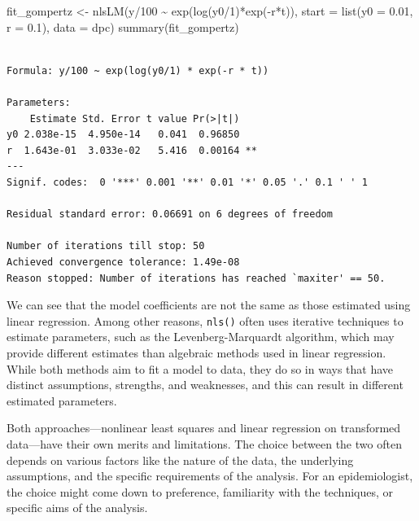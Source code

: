 \documentclass[
  letterpaper,
]{book}
\newenvironment{Shaded}{\begin{snugshade}}{\end{snugshade}}
\newcommand{\AttributeTok}[1]{\textcolor[rgb]{0.40,0.45,0.13}{#1}}
\newcommand{\DecValTok}[1]{\textcolor[rgb]{0.68,0.00,0.00}{#1}}
\newcommand{\FloatTok}[1]{\textcolor[rgb]{0.68,0.00,0.00}{#1}}
\newcommand{\FunctionTok}[1]{\textcolor[rgb]{0.28,0.35,0.67}{#1}}
\newcommand{\NormalTok}[1]{\textcolor[rgb]{0.00,0.23,0.31}{#1}}
\newcommand{\OtherTok}[1]{\textcolor[rgb]{0.00,0.23,0.31}{#1}}
\newcommand{\SpecialCharTok}[1]{\textcolor[rgb]{0.37,0.37,0.37}{#1}}
\begin{document}
\begin{Shaded}
\begin{Highlighting}[]
\NormalTok{fit\_gompertz }\OtherTok{\textless{}{-}} \FunctionTok{nlsLM}\NormalTok{(y}\SpecialCharTok{/}\DecValTok{100} \SpecialCharTok{\textasciitilde{}} \FunctionTok{exp}\NormalTok{(}\FunctionTok{log}\NormalTok{(y0}\SpecialCharTok{/}\DecValTok{1}\NormalTok{)}\SpecialCharTok{*}\FunctionTok{exp}\NormalTok{(}\SpecialCharTok{{-}}\NormalTok{r}\SpecialCharTok{*}\NormalTok{t)), }
                    \AttributeTok{start =} \FunctionTok{list}\NormalTok{(}\AttributeTok{y0 =} \FloatTok{0.01}\NormalTok{, }\AttributeTok{r =} \FloatTok{0.1}\NormalTok{), }
                    \AttributeTok{data =}\NormalTok{ dpc)}
\FunctionTok{summary}\NormalTok{(fit\_gompertz)}
\end{Highlighting}
\end{Shaded}

\begin{verbatim}

Formula: y/100 ~ exp(log(y0/1) * exp(-r * t))

Parameters:
    Estimate Std. Error t value Pr(>|t|)   
y0 2.038e-15  4.950e-14   0.041  0.96850   
r  1.643e-01  3.033e-02   5.416  0.00164 **
---
Signif. codes:  0 '***' 0.001 '**' 0.01 '*' 0.05 '.' 0.1 ' ' 1

Residual standard error: 0.06691 on 6 degrees of freedom

Number of iterations till stop: 50 
Achieved convergence tolerance: 1.49e-08
Reason stopped: Number of iterations has reached `maxiter' == 50.
\end{verbatim}

We can see that the model coefficients are not the same as those
estimated using linear regression. Among other reasons, \texttt{nls()}
often uses iterative techniques to estimate parameters, such as the
Levenberg-Marquardt algorithm, which may provide different estimates
than algebraic methods used in linear regression. While both methods aim
to fit a model to data, they do so in ways that have distinct
assumptions, strengths, and weaknesses, and this can result in different
estimated parameters.

Both approaches---nonlinear least squares and linear regression on
transformed data---have their own merits and limitations. The choice
between the two often depends on various factors like the nature of the
data, the underlying assumptions, and the specific requirements of the
analysis. For an epidemiologist, the choice might come down to
preference, familiarity with the techniques, or specific aims of the
analysis.
\end{document}
